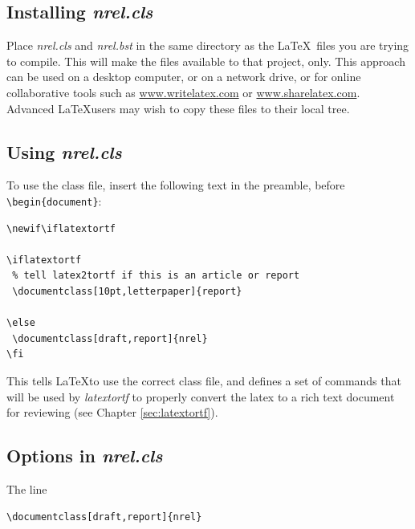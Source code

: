 \documentclass[12pt,letterpaper]{report}
\begin{document}
\subsection{Installing \emph{nrel.cls}}
Place \emph{nrel.cls} and \emph{nrel.bst} in the same directory as the \LaTeX\ files you are trying to compile. This will make the files available to that project, only. This approach can be used on a desktop computer, or on a network drive, or for online collaborative tools such as \url{www.writelatex.com} or \url{www.sharelatex.com}. Advanced \LaTeX users may wish to copy these files to their local tree.

\subsection{Using \emph{nrel.cls}}
To use the class file, insert the following text in the preamble, before \verb+\begin{document}+:

\begin{verbatim}
\newif\iflatextortf

\iflatextortf
 % tell latex2tortf if this is an article or report
 \documentclass[10pt,letterpaper]{report}
 
\else
 \documentclass[draft,report]{nrel} 
\fi
\end{verbatim}

This tells \LaTeX to use the correct class file, and defines a set of commands that will be used by \emph{latextortf} to properly convert the latex to a rich text document for reviewing (see Chapter \ref{sec:latextortf}).

\subsection{Options in \emph{nrel.cls}\label{sec:nrel.cls.options}}
The line

\begin{verbatim}
\documentclass[draft,report]{nrel}
\end{verbatim}
\end{document}
